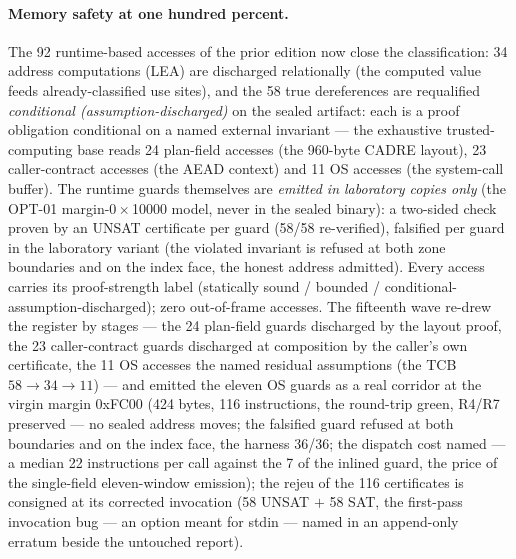 \documentclass[10pt,a4paper]{article}
\begin{document}
\paragraph{Memory safety at one hundred percent.} The 92
runtime-based accesses of the prior edition now close the
classification: 34 address computations (LEA) are discharged
relationally (the computed value feeds already-classified use
sites), and the 58 true dereferences are requalified
\emph{conditional (assumption-discharged)} on the sealed artifact:
each is a proof obligation conditional on a named external invariant
--- the exhaustive trusted-computing base reads 24 plan-field
accesses (the 960-byte CADRE layout), 23 caller-contract accesses
(the AEAD context) and 11 OS accesses (the system-call buffer). The
runtime guards themselves are \emph{emitted in laboratory copies
only} (the OPT-01 margin-$0\times$10000 model, never in the sealed
binary): a two-sided check proven by an UNSAT certificate per guard
(58/58 re-verified), falsified per guard in the laboratory variant
(the violated invariant is refused at both zone boundaries and on
the index face, the honest address admitted). Every access carries
its proof-strength label (statically sound / bounded /
conditional-assumption-discharged); zero out-of-frame accesses. The
fifteenth wave re-drew the register by stages --- the 24 plan-field
guards discharged by the layout proof, the 23 caller-contract guards
discharged at composition by the caller's own certificate, the 11 OS
accesses the named residual assumptions (the TCB $58\to34\to11$)
--- and emitted the eleven OS guards as a real corridor at the
virgin margin 0xFC00 (424 bytes, 116 instructions, the round-trip
green, R4/R7 preserved --- no sealed address moves; the falsified
guard refused at both boundaries and on the index face, the harness
36/36; the dispatch cost named --- a median 22 instructions per call
against the 7 of the inlined guard, the price of the single-field
eleven-window emission); the rejeu of the 116 certificates is
consigned at its corrected invocation (58 UNSAT $+$ 58 SAT, the
first-pass invocation bug --- an option meant for stdin --- named in
an append-only erratum beside the untouched report).
\end{document}
